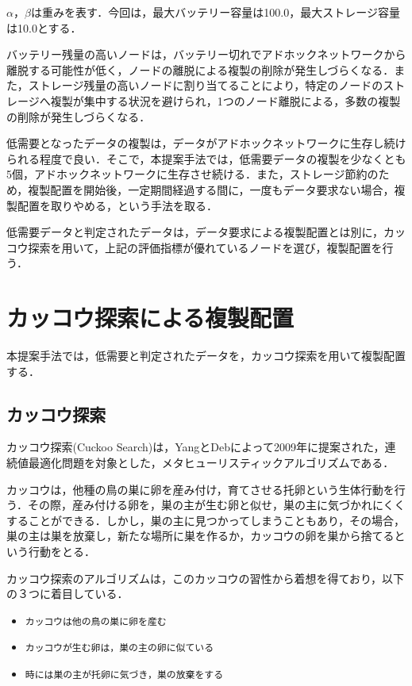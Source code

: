 \documentclass[11pt]{jreport}
\begin{document}
$\alpha$，$\beta$は重みを表す．今回は，最大バッテリー容量は100.0，最大ストレージ容量は10.0とする．
\par バッテリー残量の高いノードは，バッテリー切れでアドホックネットワークから離脱する可能性が低く，ノードの離脱による複製の削除が発生しづらくなる．また，ストレージ残量の高いノードに割り当てることにより，特定のノードのストレージへ複製が集中する状況を避けられ，1つのノード離脱による，多数の複製の削除が発生しづらくなる．
\par 低需要となったデータの複製は，データがアドホックネットワークに生存し続けられる程度で良い．そこで，本提案手法では，低需要データの複製を少なくとも5個，アドホックネットワークに生存させ続ける．また，ストレージ節約のため，複製配置を開始後，一定期間経過する間に，一度もデータ要求ない場合，複製配置を取りやめる，という手法を取る．
\par 低需要データと判定されたデータは，データ要求による複製配置とは別に，カッコウ探索を用いて，上記の評価指標が優れているノードを選び，複製配置を行う．

\section{カッコウ探索による複製配置}
本提案手法では，低需要と判定されたデータを，カッコウ探索を用いて複製配置する．

\subsection{カッコウ探索}
カッコウ探索(Cuckoo Search)は，YangとDebによって2009年に提案された，連続値最適化問題を対象とした，メタヒューリスティックアルゴリズムである\cite{yang1}\cite{yang2}．
\par カッコウは，他種の鳥の巣に卵を産み付け，育てさせる托卵という生体行動を行う．その際，産み付ける卵を，巣の主が生む卵と似せ，巣の主に気づかれにくくすることができる．しかし，巣の主に見つかってしまうこともあり，その場合，巣の主は巣を放棄し，新たな場所に巣を作るか，カッコウの卵を巣から捨てるという行動をとる．
\par カッコウ探索のアルゴリズムは，このカッコウの習性から着想を得ており，以下の３つに着目している．

\begin{itemize}
  \item {\tt カッコウは他の鳥の巣に卵を産む}
  \item {\tt カッコウが生む卵は，巣の主の卵に似ている}
  \item {\tt 時には巣の主が托卵に気づき，巣の放棄をする}
\end{itemize}
\end{document}
